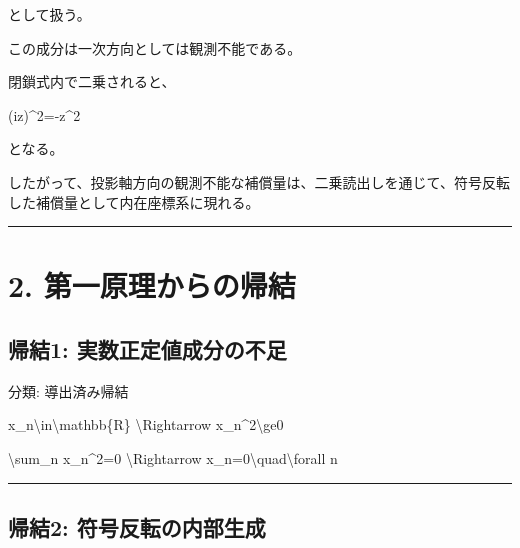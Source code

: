 \documentclass[
  a4paper,
]{ltjsarticle}
\newenvironment{Shaded}{}{}
\newcommand{\NormalTok}[1]{#1}
\begin{document}
として扱う。

この成分は一次方向としては観測不能である。

閉鎖式内で二乗されると、

\begin{Shaded}
\begin{Highlighting}[]
\NormalTok{(iz)\^{}2={-}z\^{}2}
\end{Highlighting}
\end{Shaded}

となる。

したがって、投影軸方向の観測不能な補償量は、二乗読出しを通じて、符号反転した補償量として内在座標系に現れる。

\begin{center}\rule{0.5\linewidth}{0.5pt}\end{center}

\section{2.
第一原理からの帰結}\label{ux7b2cux4e00ux539fux7406ux304bux3089ux306eux5e30ux7d50}

\subsection{帰結1:
実数正定値成分の不足}\label{ux5e30ux7d501-ux5b9fux6570ux6b63ux5b9aux5024ux6210ux5206ux306eux4e0dux8db3}

分類: 導出済み帰結

\begin{Shaded}
\begin{Highlighting}[]
\NormalTok{x\_n\textbackslash{}in\textbackslash{}mathbb\{R\}}
\NormalTok{\textbackslash{}Rightarrow}
\NormalTok{x\_n\^{}2\textbackslash{}ge0}
\end{Highlighting}
\end{Shaded}

\begin{Shaded}
\begin{Highlighting}[]
\NormalTok{\textbackslash{}sum\_n x\_n\^{}2=0}
\NormalTok{\textbackslash{}Rightarrow}
\NormalTok{x\_n=0\textbackslash{}quad\textbackslash{}forall n}
\end{Highlighting}
\end{Shaded}

\begin{center}\rule{0.5\linewidth}{0.5pt}\end{center}

\subsection{帰結2:
符号反転の内部生成}\label{ux5e30ux7d502-ux7b26ux53f7ux53cdux8ee2ux306eux5185ux90e8ux751fux6210}
\end{document}
